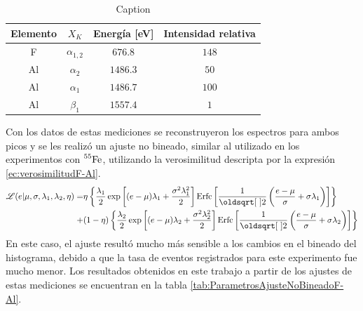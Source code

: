 \begin{table}[h]
\centering
\begin{tabular}{@{}cccc@{}}
\toprule
Elemento    &   $X_{K}$         &   Energía [eV]    &   Intensidad relativa \\ \hline \hline
F           &   $\alpha_{1,2}$  &   $676.8$         &   $148$               \\
Al          &   $\alpha_{2}$    &   $1486.3$        &   $50$                \\
Al          &   $\alpha_{1}$    &   $1486.7$        &   $100$               \\
Al          &   $\beta_{1}$     &   $1557.4$        &   $1$                 \\ \bottomrule
\end{tabular}
\caption{\footnotesize{Caption}}
\label{tab:EnergiasFluorescenciaFAl}
\end{table}
Con los datos de estas mediciones se reconstruyeron los espectros para ambos picos y se les realizó un ajuste no bineado, similar al utilizado en los experimentos con $\prescript{55}{}{\mbox{Fe}}$, utilizando la verosimilitud descripta por la expresión \eqref{ec:verosimilitudF-Al}.
\begin{align}
    \Lagr(e|\mu,
            \sigma,
            \lambda_{1},
            \lambda_{2},
            \eta)
    = &
    \eta
    \left\{
        \frac{\lambda_{1}}{2}
        \exp\left[
                (e-\mu)\lambda_{1} + \frac{\sigma^{2}\lambda_{1}^{2}}{2}
            \right]
        \mbox{Erfc}
        \left[
            \frac{1}{\sqrt{2}}
            \left(
                \frac{e - \mu}{\sigma}
                +\sigma\lambda_{1}
            \right)
        \right] \right\} \nonumber
        \\
        + &
        (1-\eta)
        \left\{
        \frac{\lambda_{2}}{2}
        \exp
            \left[
                 (e - \mu)\lambda_{2}
                 + \frac{\sigma^{2}\lambda_{2}^{2}}{2}
            \right]
        \mbox{Erfc}
        \left[
            \frac{1}{\sqrt{2}}
            \left(
                \frac{e - \mu}{\sigma}
                +\sigma\lambda_{2}
            \right)
        \right]
    \right\}
        \label{ec:verosimilitudF-Al}
\end{align}
En este caso, el ajuste resultó mucho más sensible a los cambios en el bineado del histograma, debido a que la tasa de eventos registrados para este experimento fue mucho menor. Los resultados obtenidos en este trabajo a partir de los ajustes de estas mediciones se encuentran en la tabla \ref{tab:ParametrosAjusteNoBineadoF-Al}.\\
